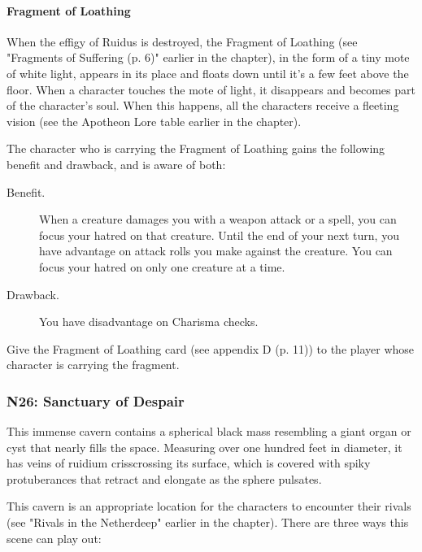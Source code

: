 \documentclass[a4paper, 11pt, bg=full, twocolumn, nooutline]{dndbook}
\begin{document}
\paragraph{Fragment of Loathing}

When the effigy of Ruidus is destroyed, the Fragment of Loathing (see "Fragments of Suffering (p. 6)" earlier in the chapter), in the form of a tiny mote of white light, appears in its place and floats down until it's a few feet above the floor. When a character touches the mote of light, it disappears and becomes part of the character's soul. When this happens, all the characters receive a fleeting vision (see the Apotheon Lore table earlier in the chapter).

The character who is carrying the Fragment of Loathing gains the following benefit and drawback, and is aware of both:

\begin{DndSidebar}{}
\begin{description}
\item[Benefit.] When a creature damages you with a weapon attack or a spell, you can focus your hatred on that creature. Until the end of your next turn, you have advantage on attack rolls you make against the creature. You can focus your hatred on only one creature at a time.
\item[Drawback.] You have disadvantage on Charisma checks.
\end{description}
\end{DndSidebar}

Give the Fragment of Loathing card (see appendix D (p. 11)) to the player whose character is carrying the fragment.

\subsubsection{N26: Sanctuary of Despair}

\begin{DndReadAloud}
This immense cavern contains a spherical black mass resembling a giant organ or cyst that nearly fills the space. Measuring over one hundred feet in diameter, it has veins of ruidium crisscrossing its surface, which is covered with spiky protuberances that retract and elongate as the sphere pulsates.
\end{DndReadAloud}

This cavern is an appropriate location for the characters to encounter their rivals (see "Rivals in the Netherdeep" earlier in the chapter). There are three ways this scene can play out:
\end{document}
